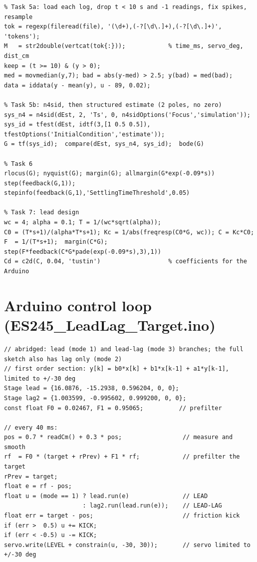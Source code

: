 \documentclass[11pt,a4paper]{article}
\begin{document}
\begin{lstlisting}
% Task 5a: load each log, drop t < 10 s and -1 readings, fix spikes, resample
tok = regexp(fileread(file), '(\d+),(-?[\d\.]+),(-?[\d\.]+)', 'tokens');
M   = str2double(vertcat(tok{:}));            % time_ms, servo_deg, dist_cm
keep = (t >= 10) & (y > 0);
med = movmedian(y,7); bad = abs(y-med) > 2.5; y(bad) = med(bad);
data = iddata(y - mean(y), u - 89, 0.02);

% Task 5b: n4sid, then structured estimate (2 poles, no zero)
sys_n4 = n4sid(dEst, 2, 'Ts', 0, n4sidOptions('Focus','simulation'));
sys_id = tfest(dEst, idtf(3,[1 0.5 0.5]), tfestOptions('InitialCondition','estimate'));
G = tf(sys_id);  compare(dEst, sys_n4, sys_id);  bode(G)

% Task 6
rlocus(G); nyquist(G); margin(G); allmargin(G*exp(-0.09*s))
step(feedback(G,1)); stepinfo(feedback(G,1),'SettlingTimeThreshold',0.05)

% Task 7: lead design
wc = 4; alpha = 0.1; T = 1/(wc*sqrt(alpha));
C0 = (T*s+1)/(alpha*T*s+1); Kc = 1/abs(freqresp(C0*G, wc)); C = Kc*C0;
F  = 1/(T*s+1);  margin(C*G);  step(F*feedback(C*G*pade(exp(-0.09*s),3),1))
Cd = c2d(C, 0.04, 'tustin')                   % coefficients for the Arduino
\end{lstlisting}

\hypertarget{arduino-control-loop-es245_leadlag_target.ino}{%
\section{Arduino control loop
(ES245\_LeadLag\_Target.ino)}\label{arduino-control-loop-es245_leadlag_target.ino}}

\begin{lstlisting}
// abridged: lead (mode 1) and lead-lag (mode 3) branches; the full sketch also has lag only (mode 2)
// first order section: y[k] = b0*x[k] + b1*x[k-1] + a1*y[k-1], limited to +/-30 deg
Stage lead = {16.0876, -15.2938, 0.596204, 0, 0};
Stage lag2 = {1.003599, -0.995602, 0.999200, 0, 0};
const float F0 = 0.02467, F1 = 0.95065;          // prefilter

// every 40 ms:
pos = 0.7 * readCm() + 0.3 * pos;                 // measure and smooth
rf  = F0 * (target + rPrev) + F1 * rf;            // prefilter the target
rPrev = target;
float e = rf - pos;
float u = (mode == 1) ? lead.run(e)               // LEAD
                      : lag2.run(lead.run(e));    // LEAD-LAG
float err = target - pos;                         // friction kick
if (err >  0.5) u += KICK;
if (err < -0.5) u -= KICK;
servo.write(LEVEL + constrain(u, -30, 30));       // servo limited to +/-30 deg
\end{lstlisting}
\end{document}
